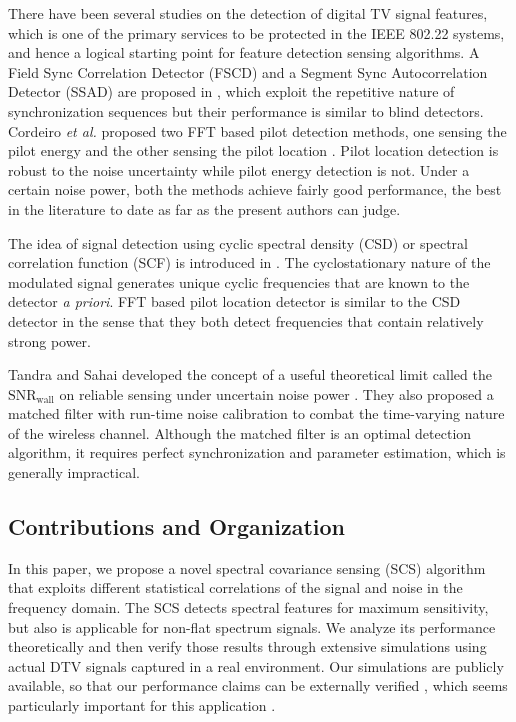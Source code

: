 \documentclass[draftclsnofoot,onecolumn,12pt]{IEEEtran}
\begin{document}
There have been several studies on the detection of digital TV signal features, which is one of the primary services to be protected in the IEEE 802.22 systems, and hence a logical starting point for feature detection sensing algorithms. A Field Sync Correlation Detector (FSCD) and a Segment Sync Autocorrelation Detector (SSAD) are proposed in \cite{CheGao07}, which exploit the repetitive nature of synchronization sequences  but their performance is similar to blind detectors. Cordeiro {\it et al.} proposed two FFT based pilot detection methods, one sensing the pilot energy and the other sensing the pilot location \cite{CorGho07}. Pilot location detection is robust to the noise uncertainty while pilot energy detection is not. Under a certain noise power, both the methods achieve fairly good performance, the best in the literature to date as far as the present authors can judge.

The idea of signal detection using cyclic spectral density (CSD) or spectral correlation function (SCF) is introduced in \cite{HanSho06}. The cyclostationary nature of the modulated signal generates unique cyclic frequencies that are known to the detector {\em a priori}. FFT based pilot location detector \cite{CorGho07} is similar to the CSD detector in the sense that they both detect frequencies that contain relatively strong power. 

Tandra and Sahai developed the concept of a useful theoretical limit called the $\mathrm{SNR_{wall}}$ on reliable sensing under uncertain noise power \cite{TanSah07, Tandra:thesis}. They also proposed a matched filter with run-time noise calibration \cite{TanSah08} to combat the time-varying nature of the wireless channel. Although the matched filter is an optimal detection algorithm, it requires perfect synchronization and parameter estimation, which is generally impractical.

\subsection{Contributions and Organization}

In this paper, we propose a novel spectral covariance sensing (SCS) algorithm that exploits different statistical correlations of the signal and noise in the frequency domain.  The SCS detects spectral features for maximum sensitivity, but also is applicable for non-flat spectrum signals. We analyze its performance theoretically and then verify those results through extensive simulations using actual DTV signals captured in a real environment.  Our simulations are publicly available, so that our performance claims can be externally verified \cite{SCS-CODE-URL}, which seems particularly important for this application \cite{VanVet09}.
\end{document}
